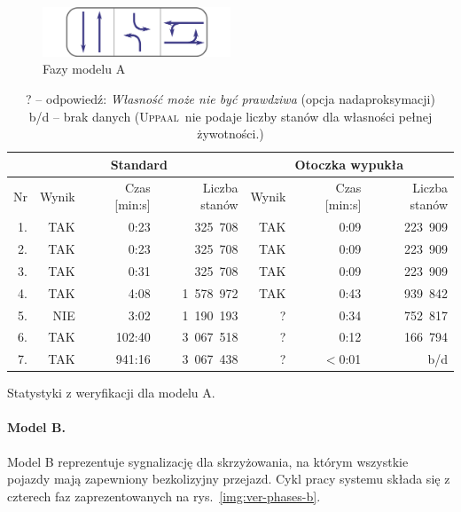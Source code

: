\documentclass{pracamgr}
\newcommand{\imgr}[1]{rys.~\ref{#1}}
\newcommand{\upp}{\textsc{Uppaal}}
\theoremstyle{plain}
\begin{document}
\begin{figure}[ht]
  \centering
  \includegraphics[width=0.5\textwidth]{img/ver-a-cycle}
  \caption{Fazy modelu A}
  \label{img:ver-phases-a}
\end{figure}
\begin{table}[ht]
  \centering
  \begin{tabular}{|r||r|r|r||r|r|r||}
    \hline
    & \multicolumn{3}{c||}{\bf Standard} & \multicolumn{3}{c||}{\bf
      Otoczka wypukła} \\ \hline
    Nr   & Wynik & Czas [min:s] & Liczba stanów & Wynik & Czas [min:s] &
    Liczba stanów \\ \hline
    1. & TAK & 0:23   &  325~708 & TAK & 0:09 & 223~909 \\
    2. & TAK & 0:23   &  325~708 & TAK & 0:09 & 223~909 \\
    3. & TAK & 0:31   &  325~708 & TAK & 0:09 & 223~909 \\
    4. & TAK & 4:08   & 1~578~972 & TAK & 0:43 & 939~842 \\
    5. & NIE & 3:02   & 1~190~193 & ?   & 0:34 & 752~817 \\
    6. & TAK & 102:40 & 3~067~518 & ?   & 0:12 & 166~794 \\
    7. & TAK & 941:16 & 3~067~438 & ?   & $<$0:01   &     b/d  
    \\\hline
  \end{tabular}
  \caption{Statystyki z weryfikacji dla modelu A.}
  \caption*{\footnotesize ? -- odpowiedź: \emph{Własność może nie być
      prawdziwa} (opcja nadaproksymacji)\\
    b/d -- brak danych (\upp\ nie podaje liczby stanów dla
    własności pełnej żywotności.)
  }
  \label{tab:ver-stats-a}
\end{table}

\paragraph{Model B.} Model B reprezentuje sygnalizację dla
skrzyżowania, na którym wszystkie pojazdy mają zapewniony bezkolizyjny
przejazd. Cykl pracy systemu składa się z czterech faz
zaprezentowanych na \imgr{img:ver-phases-b}.
\end{document}
